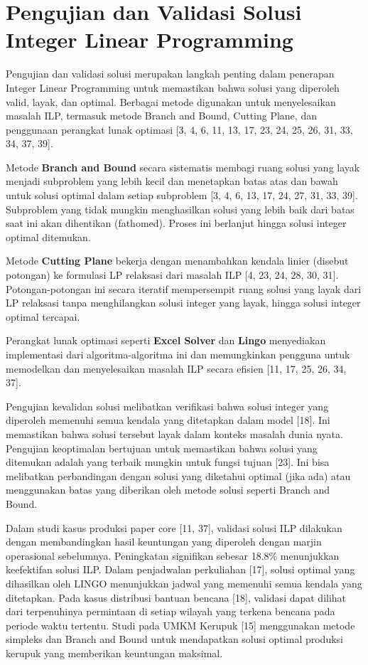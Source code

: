 \documentclass{IEEEtran}
\begin{document}
\section{Pengujian dan Validasi Solusi Integer Linear Programming}

Pengujian dan validasi solusi merupakan langkah penting dalam penerapan Integer Linear Programming untuk memastikan bahwa solusi yang diperoleh valid, layak, dan optimal. Berbagai metode digunakan untuk menyelesaikan masalah ILP, termasuk metode Branch and Bound, Cutting Plane, dan penggunaan perangkat lunak optimasi [3, 4, 6, 11, 13, 17, 23, 24, 25, 26, 31, 33, 34, 37, 39].

Metode \textbf{Branch and Bound} secara sistematis membagi ruang solusi yang layak menjadi subproblem yang lebih kecil dan menetapkan batas atas dan bawah untuk solusi optimal dalam setiap subproblem [3, 4, 6, 13, 17, 24, 27, 31, 33, 39]. Subproblem yang tidak mungkin menghasilkan solusi yang lebih baik dari batas saat ini akan dihentikan (fathomed). Proses ini berlanjut hingga solusi integer optimal ditemukan.

Metode \textbf{Cutting Plane} bekerja dengan menambahkan kendala linier (disebut potongan) ke formulasi LP relaksasi dari masalah ILP [4, 23, 24, 28, 30, 31]. Potongan-potongan ini secara iteratif mempersempit ruang solusi yang layak dari LP relaksasi tanpa menghilangkan solusi integer yang layak, hingga solusi integer optimal tercapai.

Perangkat lunak optimasi seperti \textbf{Excel Solver} dan \textbf{Lingo} menyediakan implementasi dari algoritma-algoritma ini dan memungkinkan pengguna untuk memodelkan dan menyelesaikan masalah ILP secara efisien [11, 17, 25, 26, 34, 37].

Pengujian kevalidan solusi melibatkan verifikasi bahwa solusi integer yang diperoleh memenuhi semua kendala yang ditetapkan dalam model [18]. Ini memastikan bahwa solusi tersebut layak dalam konteks masalah dunia nyata. Pengujian keoptimalan bertujuan untuk memastikan bahwa solusi yang ditemukan adalah yang terbaik mungkin untuk fungsi tujuan [23]. Ini bisa melibatkan perbandingan dengan solusi yang diketahui optimal (jika ada) atau menggunakan batas yang diberikan oleh metode solusi seperti Branch and Bound.

Dalam studi kasus produksi paper core [11, 37], validasi solusi ILP dilakukan dengan membandingkan hasil keuntungan yang diperoleh dengan marjin operasional sebelumnya. Peningkatan signifikan sebesar 18.8\% menunjukkan keefektifan solusi ILP. Dalam penjadwalan perkuliahan [17], solusi optimal yang dihasilkan oleh LINGO menunjukkan jadwal yang memenuhi semua kendala yang ditetapkan. Pada kasus distribusi bantuan bencana [18], validasi dapat dilihat dari terpenuhinya permintaan di setiap wilayah yang terkena bencana pada periode waktu tertentu. Studi pada UMKM Kerupuk [15] menggunakan metode simpleks dan Branch and Bound untuk mendapatkan solusi optimal produksi kerupuk yang memberikan keuntungan maksimal.
\end{document}
